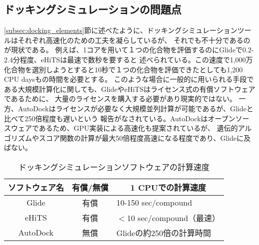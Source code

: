
\subsection{ドッキングシミュレーションの問題点}\label{subsec:docking_problem}
\ref{subsec:docking_elements}節に述べたように、ドッキングシミュレーションツールはそれぞれ高速化のための工夫を凝らしているが、
それでも不十分であるのが現状である。
例えば、1コアを用いて１つの化合物を評価するのにGlideで0.2-2.4分程度\cite{Friesner2004}、eHiTSは最速で数秒\cite{Zsoldos2007}を要すると
述べられている。この速度で1,000万化合物を選別しようとすると10秒で１つの化合物を評価できたとしても1,200 CPU daysもの時間を必要とする。
このような場合に一般的に用いられる手段である大規模計算化に関しても、GlideやeHiTSはライセンス式の有償ソフトウェアであるために、
大量のライセンスを購入する必要があり現実的ではない。
一方、AutoDockはライセンスが必要なく大規模並列計算が可能であるが、Glideと比べて250倍程度も遅いという
報告がなされている\cite{Tuccinardi2010}。AutoDockはオープンソースウェアであるため、GPU実装による高速化も提案されているが、
遺伝的アルゴリズムやスコア関数の計算が最大50倍程度高速になる程度であり\cite{Kannan2010}、Glideに及ばない。

\begin{table}[htb] \centering
	\caption{ドッキングシミュレーションソフトウェアの計算速度}
	\label{table:docking_tools}
	\begin{tabular}{c|cl}
	\hline
	ソフトウェア名					&有償/無償				&\multicolumn{1}{c}{1 CPUでの計算速度} 					\\ \hline
	Glide							&有償						&10-150 sec/compound\cite{Friesner2004}				\\
	eHiTS							&有償						&$<$10 sec/compound（最速）\cite{Zsoldos2007}			\\
	AutoDock					&無償						&Glideの約250倍の計算時間\cite{Tuccinardi2010}		\\ \hline
	\end{tabular}
\end{table}

